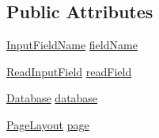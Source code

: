 \subsection*{Public Attributes}
\begin{DoxyCompactItemize}
\item 
\hyperlink{classInputFieldName}{Input\-Field\-Name} \hyperlink{classInputDetail_ac6f85380c5152c406d483726382c4798}{field\-Name}
\item 
\hyperlink{classReadInputField}{Read\-Input\-Field} \hyperlink{classInputDetail_ac0cc70b017ef94fb55acb46fc44f0df5}{read\-Field}
\item 
\hyperlink{classDatabase}{Database} \hyperlink{classInputDetail_a479cd6c13833bd5de6e5630078c961b6}{database}
\item 
\hyperlink{classPageLayout}{Page\-Layout} \hyperlink{classInputDetail_ae487757aaafba4ac372c327e2b7a9673}{page}
\end{DoxyCompactItemize}

